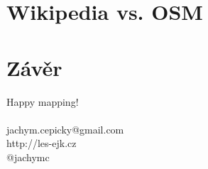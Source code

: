 \documentclass[xcolor=dvipsnames]{beamer}
\begin{document}
\section{Wikipedia vs. OSM}
\begin{frame}Wikipedia vs. OSM}
    \
\end{frame}

\section*{Závěr}
\begin{frame}
    Happy mapping!\\
    ~
    \\
    jachym.cepicky@gmail.com\\
    http://les-ejk.cz\\
    @jachymc
\end{frame}
\end{document}
